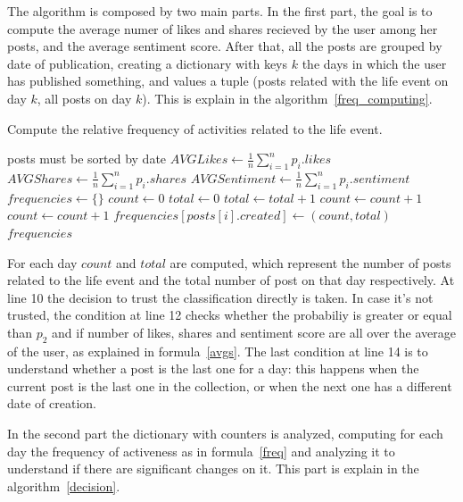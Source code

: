 The algorithm is composed by two main parts. In the first part, the goal is to compute the average numer of likes and shares recieved by the user among her posts, and the average sentiment score. After that, all the posts are grouped by date of publication, creating a dictionary with keys $k$ the days in which the user has published something, and values a tuple (posts related with the life event on day $k$, all posts on day $k$). This is explain in the algorithm~\ref{freq_computing}.

\begin{algorithm}
\caption{Compute the relative frequency of activities related to the life event.}
\label{freq_computing}
\begin{algorithmic}[1]
\Require posts must be sorted by date
\State $AVGLikes \gets \frac{1}{n} \sum_{i=1}^n p_i.likes $
\State $AVGShares \gets \frac{1}{n} \sum_{i=1}^n p_i.shares $
\State $AVGSentiment \gets \frac{1}{n} \sum_{i=1}^n p_i.sentiment$
\State $frequencies \gets \{\}$
\State $count \gets 0$
\State $total \gets 0$
	\State $total \gets total + 1$
		\State $count \gets count + 1$
		\State $count \gets count + 1$
	\EndIf
		\State $frequencies[posts[i].created] \gets (count, total)$
	\EndIf
\EndFor
\Return $frequencies$
\EndFunction 
\end{algorithmic}
\end{algorithm}

For each day $count$ and $total$ are computed, which represent the number of posts related to the life event and the total number of post on that day respectively. At line 10 the decision to trust the classification directly is taken. In case it's not trusted, the condition at line 12 checks whether the probabiliy is greater or equal than $p_2$ and if number of likes, shares and sentiment score are all over the average of the user, as explained in formula~\ref{avgs}. The last condition at line 14 is to understand whether a post is the last one for a day: this happens when the current post is the last one in the collection, or when the next one has a different date of creation.

In the second part the dictionary with counters is analyzed, computing for each day the frequency of activeness as in formula~\ref{freq} and analyzing it to understand if there are significant changes on it. This part is explain in the algorithm~\ref{decision}.

